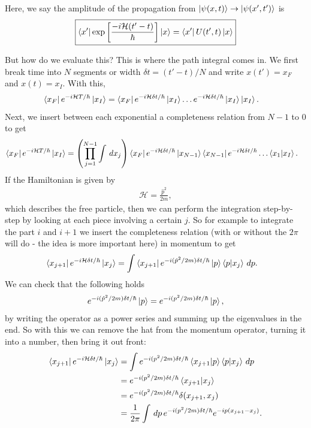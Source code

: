 \documentclass{book}
\theoremstyle{definition}
\newcommand{\ham}{\mathcal{H}}
\newcommand{\f}[2]{\frac{#1}{#2}}
\newcommand{\lp}{\left(}
\newcommand{\rp}{\right)}
\newcommand{\lb}{\left[}
\newcommand{\rb}{\right]}
\begin{document}
Here, we say the amplitude of the propagation from $\ket{\psi(x,t)} \to \ket{\psi(x',t')}$ is 
\begin{align}
\boxed{\bra{x'}\exp \lb \f{-i \ham (t'-t)}{\hbar} \rb \ket{x} = \bra{x'}U(t',t)\ket{x}}
\end{align}


But how do we evaluate this? This is where the path integral comes in. We first break time into $N$ segments or width $\delta t = (t' - t)/N$ and write $x(t') = x_F$ and $x(t) = x_I$. With this,
\begin{align}
\bra{x_F}e^{-i\ham T / \hbar}\ket{x_I} &= \bra{x_F}e^{-i\ham \delta t / \hbar}\ket{x_I} \dots e^{-i\ham \delta t / \hbar}\ket{x_I} \ket{x_I}.
\end{align}
Next, we insert between each exponential a completeness relation from $N-1$ to $0$ to get
\begin{align}\label{path}
\bra{x_F}e^{-i\ham T / \hbar}\ket{x_I} &= \lp\prod_{j=1}^{N-1}\int \,dx_j \rp\bra{x_F}e^{-i\ham \delta t / \hbar}\ket{x_{N-1}}\bra{x_{N-1}}e^{-i\ham \delta t / \hbar}\dots \bra{x_1}\ket{x_I}.
\end{align}
If the Hamiltonian is given by
\begin{align}
\ham = \f{\hat{p}^2}{2m},
\end{align}
which describes the free particle, then we can perform the integration step-by-step by looking at each piece involving a certain $j$. So for example to integrate the part $i$ and $i+1$ we insert the completeness relation (with or without the $2\pi$ will do - the idea is more important here) in momentum to get
\begin{align}
\bra{x_{j+1}}e^{-i\ham \delta t / \hbar} \ket{x_j}
&= \int \bra{x_{j+1}} e^{-i(\hat{p}^2/2m) \delta t / \hbar}  \ket{p}\braket{p}{x_j} \,dp.
\end{align}
We can check that the following holds
\begin{align}
e^{-i(\hat{p}^2/2m) \delta t / \hbar}  \ket{p} =  e^{-i(p^2/2m) \delta t / \hbar} \ket{p},
\end{align}
by writing the operator as a power series and summing up the eigenvalues in the end. So with this we can remove the hat from the momentum operator, turning it into a number, then bring it out front:
\begin{align}
\bra{x_{j+1}}e^{-i\ham \delta t / \hbar} \ket{x_j} &=
\int  e^{-i({p}^2/2m) \delta t / \hbar}\braket{x_{j+1}}{p}\braket{p}{x_j} \,dp\\
&= e^{-i({p}^2/2m) \delta t / \hbar}\braket{x_{j+1}}{x_j}\\
&= e^{-i({p}^2/2m) \delta t / \hbar}\delta(x_{j+1}, x_j)\\
&= \f{1}{2\pi}\int\,dp \, e^{-i({p}^2/2m) \delta t / \hbar} e^{-ip(x_{j+1} - x_j)}.
\end{align}
\end{document}
